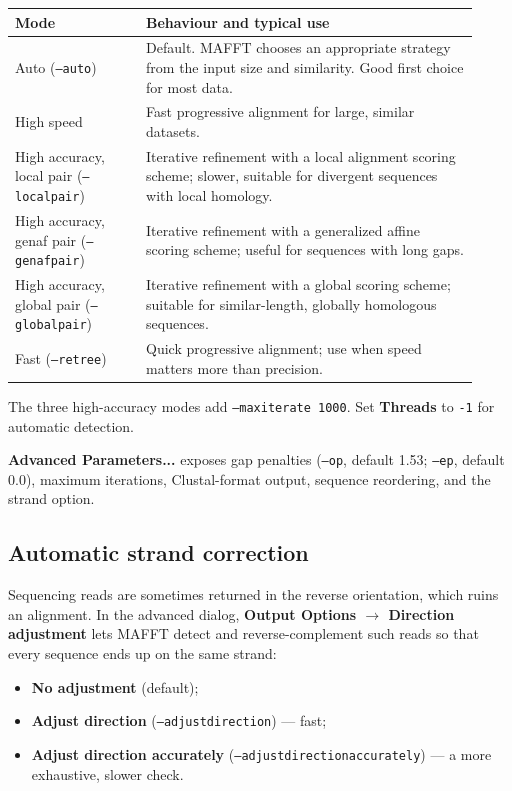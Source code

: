 \documentclass[10pt]{report}
\begin{document}
\begin{longtable}{@{}>{\raggedright\arraybackslash}p{0.26\linewidth}
                      >{\raggedright\arraybackslash}p{0.66\linewidth}@{}}
\toprule
Mode & Behaviour and typical use \\
\midrule
\endhead
Auto (\texttt{--auto}) & Default. MAFFT chooses an appropriate strategy from
the input size and similarity. Good first choice for most data. \\
High speed & Fast progressive alignment for large, similar datasets. \\
High accuracy, local pair (\texttt{--localpair}) & Iterative refinement with a
local alignment scoring scheme; slower, suitable for divergent sequences with
local homology. \\
High accuracy, genaf pair (\texttt{--genafpair}) & Iterative refinement with a
generalized affine scoring scheme; useful for sequences with long gaps. \\
High accuracy, global pair (\texttt{--globalpair}) & Iterative refinement with
a global scoring scheme; suitable for similar-length, globally homologous
sequences. \\
Fast (\texttt{--retree}) & Quick progressive alignment; use when speed matters
more than precision. \\
\bottomrule
\end{longtable}

The three high-accuracy modes add \texttt{--maxiterate 1000}. Set
\textbf{Threads} to \texttt{-1} for automatic detection.

\textbf{Advanced Parameters...} exposes gap penalties (\texttt{--op}, default
1.53; \texttt{--ep}, default 0.0), maximum iterations, Clustal-format output,
sequence reordering, and the strand option.

\subsection{Automatic strand correction}

Sequencing reads are sometimes returned in the reverse orientation, which
ruins an alignment. In the advanced dialog, \textbf{Output Options $\rightarrow$
Direction adjustment} lets MAFFT detect and reverse-complement such reads so
that every sequence ends up on the same strand:

\begin{itemize}
  \item \textbf{No adjustment} (default);
  \item \textbf{Adjust direction} (\texttt{--adjustdirection}) --- fast;
  \item \textbf{Adjust direction accurately}
        (\texttt{--adjustdirectionaccurately}) --- a more exhaustive, slower
        check.
\end{itemize}
\end{document}
